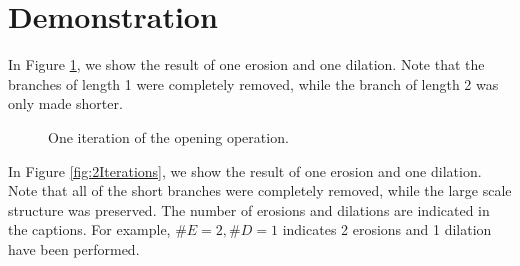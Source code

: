 \documentclass{InsightArticle}
\begin{document}
\section{Demonstration}
\label{sec:Demonstration}
In Figure \ref{fig:1Iteration}, we show the result of one erosion and one dilation. Note that the branches of length 1 were completely removed, while the branch of length 2 was only made shorter.
\begin{figure}[H]
\centering
{}
\caption{One iteration of the opening operation.}
\label{fig:1Iteration}
\end{figure}

In Figure \ref{fig:2Iterations}, we show the result of one erosion and one dilation. Note that all of the short branches were completely removed, while the large scale structure was preserved. The number of erosions and dilations are indicated in the captions. For example, $\#E=2, \#D=1$ indicates 2 erosions and 1 dilation have been performed.
\end{document}

